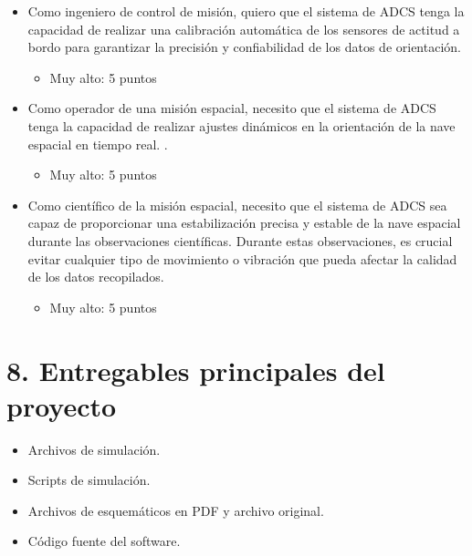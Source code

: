 \documentclass[
11pt, %
]{charter}
\begin{document}
\begin{itemize}

	 \item Como ingeniero de control de misión, quiero que el sistema de ADCS tenga la capacidad de realizar una calibración automática de los sensores de actitud a bordo para garantizar la precisión y confiabilidad de los datos de orientación. 
		\begin{itemize}
			\item Muy alto: 5 puntos
		\end{itemize}
	
	
	\item Como operador de una misión espacial, necesito que el sistema de ADCS tenga la capacidad de realizar ajustes dinámicos en la orientación de la nave espacial en tiempo real. .
		\begin{itemize}
			\item Muy alto: 5 puntos
		\end{itemize}
	\item Como científico de la misión espacial, necesito que el sistema de ADCS sea capaz de proporcionar una estabilización precisa y estable de la nave espacial durante las observaciones científicas. Durante estas observaciones, es crucial evitar cualquier tipo de movimiento o vibración que pueda afectar la calidad de los datos recopilados. 
		\begin{itemize}
			\item Muy alto: 5 puntos
		\end{itemize}
\end{itemize}


\section{8. Entregables principales del proyecto}
\label{sec:entregables}
\begin{itemize}
	\item Archivos de simulación. 
	\item Scripts de simulación. 
	\item Archivos de esquemáticos en PDF y archivo original. 
	\item Código fuente del software. 

\end{itemize}
\end{document}
